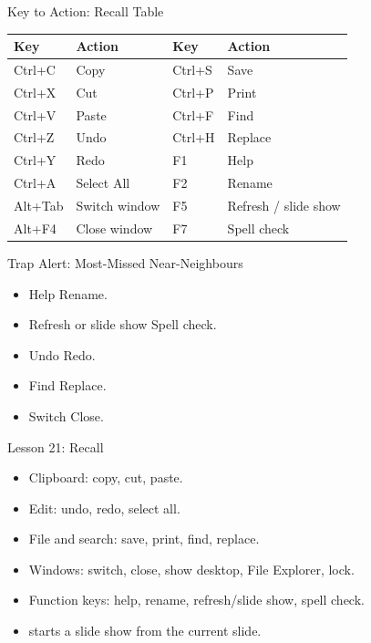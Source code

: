 \documentclass[aspectratio=169]{beamer}
\begin{document}
\begin{frame}{Key to Action: Recall Table}
  \begin{center}
    \begin{tabular}{llll}
      \toprule
      \textbf{Key} & \textbf{Action} & \textbf{Key} & \textbf{Action} \\
      \midrule
      Ctrl+C & Copy & Ctrl+S & Save \\
      Ctrl+X & Cut & Ctrl+P & Print \\
      Ctrl+V & Paste & Ctrl+F & Find \\
      Ctrl+Z & Undo & Ctrl+H & Replace \\
      Ctrl+Y & Redo & F1 & Help \\
      Ctrl+A & Select All & F2 & Rename \\
      Alt+Tab & Switch window & F5 & Refresh / slide show \\
      Alt+F4 & Close window & F7 & Spell check \\
      \bottomrule
    \end{tabular}
  \end{center}
\end{frame}

\begin{frame}{Trap Alert: Most-Missed Near-Neighbours}
  \begin{itemize}
    \item {} Help \hfill {} \hfill {} Rename.
    \item {} Refresh or slide show \hfill {} \hfill {}
      Spell check.
    \item {} Undo \hfill {} \hfill {} Redo.
    \item {} Find \hfill {} \hfill {} Replace.
    \item {} Switch \hfill {} \hfill {} Close.
  \end{itemize}
\end{frame}

\begin{frame}{Lesson 21: Recall}
  \begin{itemize}
    \item Clipboard:  copy,  cut,  paste.
    \item Edit:  undo,  redo,  select all.
    \item File and search:  save,  print, 
      find,  replace.
    \item Windows:  switch,  close,  show
      desktop,  File Explorer,  lock.
    \item Function keys:  help,  rename, 
      refresh/slide show,  spell check.
    \item {} starts a slide show from the current slide.
  \end{itemize}
\end{frame}
\end{document}
